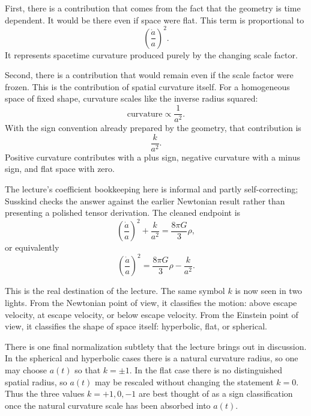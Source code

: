 First, there is a contribution that comes from the fact that the geometry is time dependent. It would be there even if space were flat. This term is proportional to
\begin{equation}
\left(\frac{\dot a}{a}\right)^2.
\end{equation}
It represents spacetime curvature produced purely by the changing scale factor.

Second, there is a contribution that would remain even if the scale factor were frozen. This is the contribution of spatial curvature itself. For a homogeneous space of fixed shape, curvature scales like the inverse radius squared:
\begin{equation}
\text{curvature} \propto \frac{1}{a^2}.
\end{equation}
With the sign convention already prepared by the geometry, that contribution is
\begin{equation}
\frac{k}{a^2}.
\end{equation}
Positive curvature contributes with a plus sign, negative curvature with a minus sign, and flat space with zero.

The lecture's coefficient bookkeeping here is informal and partly self-correcting; Susskind checks the answer against the earlier Newtonian result rather than presenting a polished tensor derivation. The cleaned endpoint is
\begin{equation}
\left(\frac{\dot a}{a}\right)^2+\frac{k}{a^2}=\frac{8\pi G}{3}\rho,
\end{equation}
or equivalently
\begin{equation}
\left(\frac{\dot a}{a}\right)^2=\frac{8\pi G}{3}\rho-\frac{k}{a^2}.
\end{equation}

This is the real destination of the lecture. The same symbol \(k\) is now seen in two lights. From the Newtonian point of view, it classifies the motion: above escape velocity, at escape velocity, or below escape velocity. From the Einstein point of view, it classifies the shape of space itself: hyperbolic, flat, or spherical.

There is one final normalization subtlety that the lecture brings out in discussion. In the spherical and hyperbolic cases there is a natural curvature radius, so one may choose \(a(t)\) so that \(k=\pm 1\). In the flat case there is no distinguished spatial radius, so \(a(t)\) may be rescaled without changing the statement \(k=0\). Thus the three values \(k=+1,0,-1\) are best thought of as a sign classification once the natural curvature scale has been absorbed into \(a(t)\).

